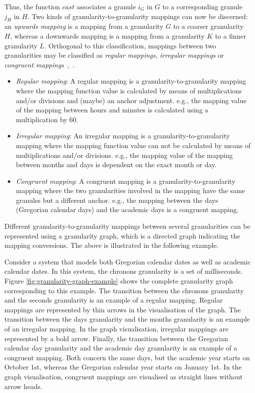 Thus, the function $cast$ associates a granule $i_G$ in $G$ to a corresponding granule $j_H$ in $H$. Two kinds of granularity-to-granularity mappings can now be discerned: an \emph{upwards mapping} is a mapping from a granularity $G$ to a coarser granularity $H$, whereas a downwards mapping is a mapping from a granularity $K$ to a finner granularity $L$. Orthogonal to this classification, mappings between two granularities may be classified as \emph{regular mappings}, \emph{irregular mappings} or \emph{congruent mappings}~\cite{Lin97},~\cite{DyresonSnodgrass1994}.
\begin{itemize}
\item
\emph{Regular mapping}: A regular mapping is a granularity-to-granularity mapping where the mapping function value is calculated by means of multiplications and/or divisions and (maybe) an anchor adjustment. e.g., the mapping value of the mapping between hours and minutes is calculated using a multiplication by $60$. 
\item
\emph{Irregular mapping}: An irregular mapping is a granularity-to-granularity mapping where the mapping function value can not be calculated by means of multiplications and/or divisions. e.g., the mapping value of the mapping between months and days is dependent on the exact month or day. 
\item
\emph{Congruent mapping}: A congruent mapping is a granularity-to-granularity mapping where the two granularities involved in the mapping have the same granules but a different anchor. e.g., the mapping between the days (Gregorian calendar days) and the academic days is a congruent mapping.
\end{itemize}

Different granularity-to-granularity mappings between several granularities can be represented using a granularity graph, which is a directed graph indicating the mapping conversions. The above is illustrated in the following example.

\begin{example}
\label{examplegrangraph}
Consider a system that models both Gregorian calendar dates as well as academic calendar dates. In this system, the chronons granularity is a set of milliseconds. Figure \ref{fig:granularity-graph-example} shows the complete granularity graph corresponding to this example. The transition between the chronons granularity and the seconds granularity is an example of a regular mapping. Regular mappings are represented by thin arrows in the visualisation of the graph. The transition between the days granularity and the months granularity is an example of an irregular mapping. In the graph visualisation, irregular mappings are represented by a bold arrow. Finally, the transition between the Gregorian calendar day granularity and the academic day granularity is an example of a congruent mapping. Both concern the same days, but the academic year starts on October 1st, whereas the Gregorian calendar year starts on January 1st. In the graph visualisation, congruent mappings are visualised as straight lines without arrow heads.

\end{example}



